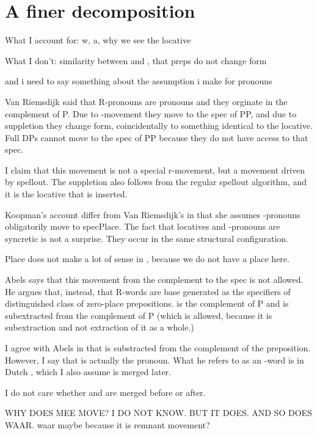 \documentclass{article}
\begin{document}
\section{A finer decomposition}

What I account for: w, a, why we see the locative

What I don't: similarity between  and , that preps do not change form

and i need to say something about the assumption i make for pronouns






Van Riemsdijk said that R-pronouns are pronouns and they orginate in the complement of P. Due to -movement they move to the spec of PP, and due to suppletion they change form, coincidentally to something identical to the locative. Full DPs cannot move to the spec of PP because they do not have access to that spec.

I claim that this movement is not a special r-movement, but a movement driven by spellout. The suppletion also follows from the regular spellout algorithm, and it is the locative that is inserted.


Koopman's account differ from Van Riemsdijk's in that she assumes -pronouns obligatorily move to specPlace. The fact that locatives and -pronouns are syncretic is not a surprise. They occur in the same structural configuration.

Place does not make a lot of sense in , because we do not have a place here.

Abels says that this movement from the complement to the spec is not allowed. He argues that, instead, that R-words are base generated as the specifiers of distinguished class of zero-place prepositions.  is the complement of P and is subextracted from the complement of P (which is allowed, because it is subextraction and not extraction of it as a whole.)

I agree with Abels in that  is substracted from the complement of the preposition. However, I say that  is actually the pronoun. What he refers to as an -word is in Dutch , which I also assume is merged later.




I do not care whether  and  are merged before or after.

WHY DOES MEE MOVE? I DO NOT KNOW.
BUT IT DOES.
AND SO DOES WAAR.
waar maybe because it is remnant movement?
\end{document}

